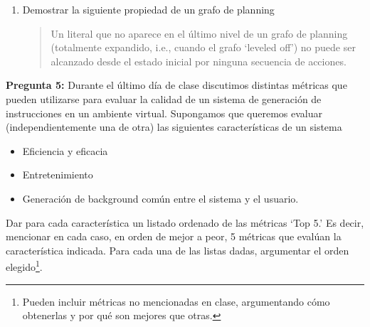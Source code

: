 \documentclass{article}
\begin{document}
\begin{enumerate}
\vspace*{-.2cm}
Construir los niveles 0, 1 y 2 del grafo de planning (graphplan) indicando mutexes. 

\item Demostrar la siguiente propiedad de un grafo de planning

\begin{quote}
Un literal que no aparece en el \'ultimo nivel de un grafo de planning (totalmente
expandido, i.e., cuando el grafo `leveled off') no puede ser alcanzado desde el estado inicial por ninguna secuencia de
acciones. 
\end{quote}
\end{enumerate}

\medskip
\textbf{Pregunta 5:} Durante el \'ultimo d\'ia de clase discutimos distintas 
m\'etricas que pueden utilizarse para evaluar la calidad de un sistema de 
generaci\'on de instrucciones en un ambiente virtual.  Supongamos que queremos 
evaluar (independientemente una de otra) las siguientes caracter\'isticas de un sistema
\begin{itemize}
   \item Eficiencia y eficacia\\[-2em]
   \item Entretenimiento\\[-2em]
   \item Generaci\'on de background com\'un entre el sistema y el usuario.  
\end{itemize}

Dar para cada caracter\'istica un listado ordenado 
de las m\'etricas `Top 5.' Es decir, mencionar en cada caso, en orden de mejor a 
peor, 5 m\'etricas que eval\'uan la caracter\'istica indicada.  Para cada una 
de las listas dadas, argumentar el orden elegido\footnote{Pueden incluir m\'etricas
no mencionadas en clase, argumentando c\'omo obtenerlas y por qu\'e son mejores que otras.}.    
\end{document}
